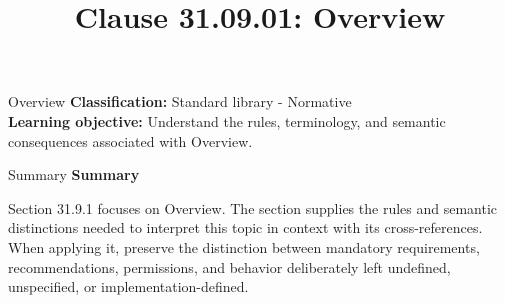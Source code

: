 \documentclass[10pt,letterpaper]{article}
\title{Clause 31.09.01: Overview}
\author{}
\date{}
\begin{document}
\maketitle
\begin{CornellOverviewBox}{Overview}
\textbf{Classification:} Standard library - Normative\\[2pt]
\textbf{Learning objective:} Understand the rules, terminology, and semantic consequences associated with Overview.
\end{CornellOverviewBox}\begin{CornellSummaryBox}{Summary}
{\sffamily\bfseries\color{Accent} Summary}\par\vspace{3pt}Section 31.9.1 focuses on Overview. The section supplies the rules and semantic distinctions needed to interpret this topic in context with its cross-references. When applying it, preserve the distinction between mandatory requirements, recommendations, permissions, and behavior deliberately left undefined, unspecified, or implementation-defined.
\end{CornellSummaryBox}
\end{document}
